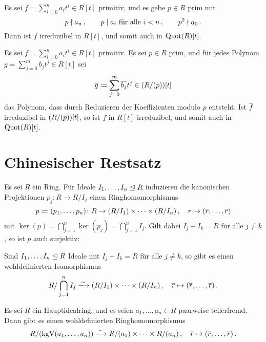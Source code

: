 \begin{proposition}[Eisenstein]
  Es sei $f = \sum_{i=0}^n a_i t^i \in R[t]$ primitiv, und es gebe $p \in R$ prim mit
  \[
    p \mathrel{\nmid} a_n \,,
    \qquad
    \text{$p \mathrel{|} a_i$ für alle $i < n$} \,,
    \qquad
    p^2 \mathrel{\nmid} a_0 \,.
  \]
  Dann ist $f$ irreduzibel in $R[t]$, und somit auch in $\operatorname{Quot}(R)[t]$.
\end{proposition}

\begin{proposition}[Reduktionskriterium]
  Es sei $f = \sum_{i=0}^n a_i t^i \in R[t]$ primitiv.
  Es sei $p \in R$ prim, und für jedes Polynom $g = \sum_{j=0}^m b_j t^j \in R[t]$ sei
  \[
              \overline{g}
    \coloneqq  \sum_{j=0}^m \overline{b_j} t^j
    \in       (R/(p))[t]
  \]
  das Polynom, dass durch Reduzieren der Koeffizienten modulo $p$ entsteht.
  Ist $\overline{f}$ irreduzibel in $(R/(p))[t]$, so ist $f$ in $R[t]$ irreduzibel, und somit auch in $\operatorname{Quot}(R)[t]$.
\end{proposition}







\section{Chinesischer Restsatz}

Es sei $R$ ein Ring.
Für Ideale $I_1, \dotsc, I_n \mathrel{\trianglelefteq} R$ induzieren die kanonischen Projektionen $p_j \colon R \to R/I_j$ einen Ringhomomorphismus
\[
            p
  \coloneqq  (p_1, \dotsc, p_n)
  \colon    R
  \to       (R/I_1) \times \dotsb \times (R/I_n) \,,
  \quad     r
  \mapsto   (\overline{r}, \dotsc, \overline{r})
\]
mit $\ker(p) = \bigcap_{j=1}^n \ker(p_j) = \bigcap_{j=1}^n I_j$.
Gilt dabei $I_j + I_k = R$ für alle $j \neq k$, so ist $p$ auch surjektiv:

\begin{theorem}
  Sind $I_1, \dotsc, I_n \mathrel{\trianglelefteq} R$ Ideale mit $I_j + I_k = R$ für alle $j \neq k$, so gibt es einen wohldefinierten Isomorphismus
  \[
                            R / \bigcap_{j=1}^n I_j
    \xlongrightarrow{\sim}  (R/I_1) \times \dotsb \times (R/I_n) \,,
    \quad                   \class{r}
    \mapsto                 (\class{r}, \dotsc, \class{r}) \,.
  \]
\end{theorem}

\begin{corollary}
  Es sei $R$ ein Hauptidealring, und es seien $a_1, \dotsc, a_n \in R$ paarweise teilerfremd.
  Dann gibt es einen wohldefinierten Ringhomomorphismus
  \[
                            R/\genideal{\kgV(a_1, \dotsc, a_n)}
    \xlongrightarrow{\sim}  R/\genideal{a_1} \times \dotsb \times R/\genideal{a_n} \,,
    \quad                   \class{r}
    \mapsto                 ( \class{r}, \dotsc, \class{r} ) \,.
  \]
\end{corollary}


